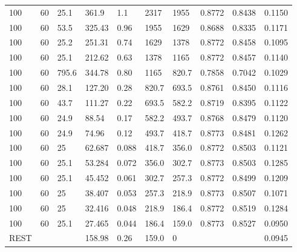 \begin{chplandscape}
\begin{small}
\begin{longtable}{p{1.5cm}p{1.1cm}p{1.1cm}p{1.3cm}p{1.5cm}p{1.3cm}p{1.3cm}p{1.5cm}p{1.5cm}p{1.3cm}}
100 & 60 & 25.1 & 361.9 & 1.1 & 2317 & 1955 & 0.8772 & 0.8438 & 0.1150 \\
100 & 60 & 53.5 & 325.43 & 0.96 & 1955 & 1629 & 0.8688 & 0.8335 & 0.1171 \\
100 & 60 & 25.2 & 251.31 & 0.74 & 1629 & 1378 & 0.8772 & 0.8458 & 0.1095 \\
100 & 60 & 25.1 & 212.62 & 0.63 & 1378 & 1165 & 0.8772 & 0.8457 & 0.1140 \\
100 & 60 & 795.6 & 344.78 & 0.80 & 1165 & 820.7 & 0.7858 & 0.7042 & 0.1029 \\
100 & 60 & 28.1 & 127.20 & 0.28 & 820.7 & 693.5 & 0.8761 & 0.8450 & 0.1116 \\
100 & 60 & 43.7 & 111.27 & 0.22 & 693.5 & 582.2 & 0.8719 & 0.8395 & 0.1122 \\
100 & 60 & 24.9 & 88.54 & 0.17 & 582.2 & 493.7 & 0.8768 & 0.8479 & 0.1120 \\
100 & 60 & 24.9 & 74.96 & 0.12 & 493.7 & 418.7 & 0.8773 & 0.8481 & 0.1262 \\
100 & 60 & 25 & 62.687 & 0.088 & 418.7 & 356.0 & 0.8772 & 0.8503 & 0.1121 \\
100 & 60 & 25.1 & 53.284 & 0.072 & 356.0 & 302.7 & 0.8773 & 0.8503 & 0.1285 \\
100 & 60 & 25.1 & 45.452 & 0.061 & 302.7 & 257.3 & 0.8772 & 0.8499 & 0.1209 \\
100 & 60 & 25 & 38.407 & 0.053 & 257.3 & 218.9 & 0.8773 & 0.8507 & 0.1071 \\
100 & 60 & 25 & 32.416 & 0.048 & 218.9 & 186.4 & 0.8772 & 0.8519 & 0.1284 \\
100 & 60 & 25.1 & 27.465 & 0.044 & 186.4 & 159.0 & 0.8773 & 0.8527 & 0.0950 \\
REST &  &  & 158.98 & 0.26 & 159.0 & 0 &  &  & 0.0945 \\
\end{longtable}
\end{small}
\end{chplandscape}

\clearpage

